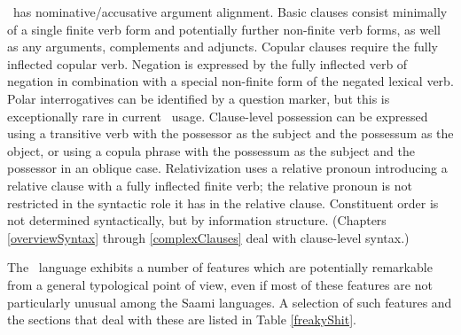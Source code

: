 \PS\ has nominative/accusative argument alignment. 
Basic clauses consist minimally of a single finite verb form and potentially further non-finite verb forms, %
as well as any arguments, complements and adjuncts. Copular clauses require the fully inflected copular verb. Negation is expressed by the fully inflected verb of negation in combination with a special non-finite form of the negated lexical verb. Polar interrogatives can be identified by a question marker, but this is exceptionally rare in current \PS\ usage. Clause-level possession can be expressed using a transitive verb with the possessor as the subject and the possessum as the object, or using a copula phrase with the possessum as the subject and the possessor in an oblique case. Relativization uses a relative pronoun introducing a relative clause with a fully inflected finite verb; the relative pronoun is not restricted in the syntactic role it has in the relative clause. Constituent order is not determined syntactically, but by information structure. (Chapters \ref{overviewSyntax} through \ref{complexClauses} deal with clause-level syntax.) 

The \PS\ language exhibits a number of features which are potentially remarkable from a general typological point of view, even if most of these features are not particularly unusual among the Saami languages. A selection of such features and the sections that deal with these are listed in Table \vref{freakyShit}. 

